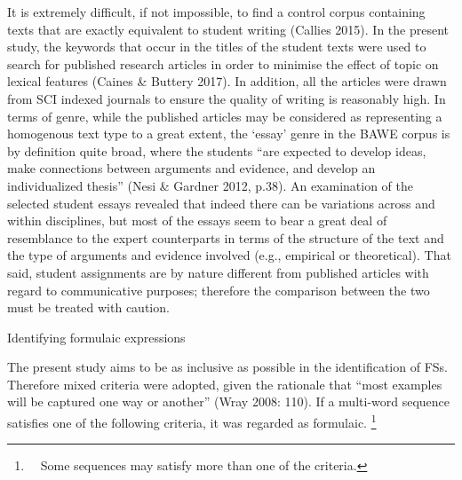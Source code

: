 \begin{styleStandard}
It is extremely difficult, if not impossible, to find a control corpus containing texts that are exactly equivalent to student writing (Callies 2015). In the present study, the keywords that occur in the titles of the student texts were used to search for published research articles in order to minimise the effect of topic on lexical features (Caines \& Buttery 2017). In addition, all the articles were drawn from SCI indexed journals to ensure the quality of writing is reasonably high. In terms of genre, while the published articles may be considered as representing a homogenous text type to a great extent, the ‘essay’ genre in the BAWE corpus is by definition quite broad, where the students “are expected to develop ideas, make connections between arguments and evidence, and develop an individualized thesis” (Nesi \& Gardner 2012, p.38). An examination of the selected student essays revealed that indeed there can be variations across and within disciplines, but most of the essays seem to bear a great deal of resemblance to the expert counterparts in terms of the structure of the text and the type of arguments and evidence involved (e.g., empirical or theoretical). That said, student assignments are by nature different from published articles with regard to communicative purposes; therefore the comparison between the two must be treated with caution. 
\end{styleStandard}

\begin{listWWNumxivleveli}
\item 
\begin{listWWNumxivlevelii}
\item 
\begin{stylelsSectionii}
Identifying formulaic expressions
\end{stylelsSectionii}
\end{listWWNumxivlevelii}
\end{listWWNumxivleveli}
\begin{styleStandard}
The present study aims to be as inclusive as possible in the identification of FSs. Therefore mixed criteria were adopted, given the rationale that “most examples will be captured one way or another” (Wray 2008: 110). If a multi-word sequence satisfies one of the following criteria, it was regarded as formulaic. \footnote{\textrm{\ \ Some sequences may satisfy more than one of the criteria.}}
\end{styleStandard}

